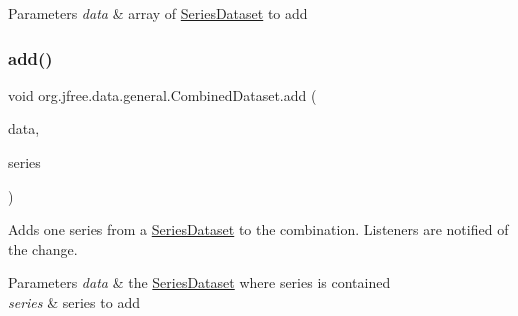 \begin{DoxyParams}{Parameters}
{\em data} & array of \mbox{\hyperlink{interfaceorg_1_1jfree_1_1data_1_1general_1_1_series_dataset}{Series\+Dataset}} to add \\
\hline
\end{DoxyParams}
\mbox{\label{classorg_1_1jfree_1_1data_1_1general_1_1_combined_dataset_a06aeb170099a39d4efc4bee76a954431}} 
\subsubsection{\texorpdfstring{add()}{add()}\hspace{0.1cm}{\footnotesize\ttfamily [3/3]}}
{\footnotesize\ttfamily void org.\+jfree.\+data.\+general.\+Combined\+Dataset.\+add (\begin{DoxyParamCaption}\item[{\mbox{\hyperlink{interfaceorg_1_1jfree_1_1data_1_1general_1_1_series_dataset}{Series\+Dataset}}}]{data,  }\item[{int}]{series }\end{DoxyParamCaption})}

Adds one series from a \mbox{\hyperlink{interfaceorg_1_1jfree_1_1data_1_1general_1_1_series_dataset}{Series\+Dataset}} to the combination. Listeners are notified of the change.


\begin{DoxyParams}{Parameters}
{\em data} & the \mbox{\hyperlink{interfaceorg_1_1jfree_1_1data_1_1general_1_1_series_dataset}{Series\+Dataset}} where series is contained \\
\hline
{\em series} & series to add \\
\hline
\end{DoxyParams}
\mbox{\label{classorg_1_1jfree_1_1data_1_1general_1_1_combined_dataset_ae75dd2adbfae3aa7c8f4258630c9063d}} 
